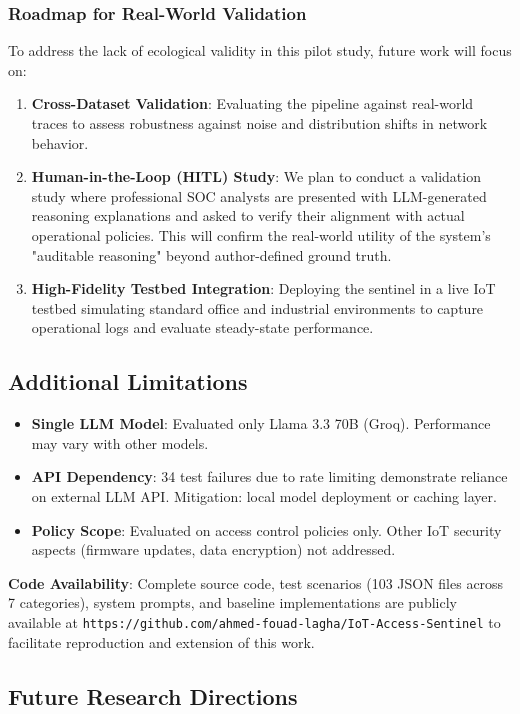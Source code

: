 \documentclass[conference]{IEEEtran}
\begin{document}
\subsubsection{Roadmap for Real-World Validation}
To address the lack of ecological validity in this pilot study, future work will focus on:
\begin{enumerate}
    \item \textbf{Cross-Dataset Validation}: Evaluating the pipeline against real-world traces to assess robustness against noise and distribution shifts in network behavior.
    \item \textbf{Human-in-the-Loop (HITL) Study}: We plan to conduct a validation study where professional SOC analysts are presented with LLM-generated reasoning explanations and asked to verify their alignment with actual operational policies. This will confirm the real-world utility of the system's "auditable reasoning" beyond author-defined ground truth.
    \item \textbf{High-Fidelity Testbed Integration}: Deploying the sentinel in a live IoT testbed simulating standard office and industrial environments to capture operational logs and evaluate steady-state performance.
\end{enumerate}

\subsection{Additional Limitations}

\begin{itemize}
    \item \textbf{Single LLM Model}: Evaluated only Llama 3.3 70B (Groq). Performance may vary with other models.
    \item \textbf{API Dependency}: 34 test failures due to rate limiting demonstrate reliance on external LLM API. Mitigation: local model deployment or caching layer.
    \item \textbf{Policy Scope}: Evaluated on access control policies only. Other IoT security aspects (firmware updates, data encryption) not addressed.
\end{itemize}

\textbf{Code Availability}: Complete source code, test scenarios (103 JSON files across 7 categories), system prompts, and baseline implementations are publicly available at \texttt{https://github.com/ahmed-fouad-lagha/IoT-Access-Sentinel} to facilitate reproduction and extension of this work.
\subsection{Future Research Directions}
\end{document}
